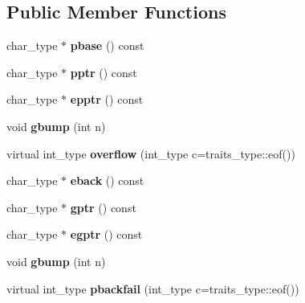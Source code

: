 \subsection*{Public Member Functions}
\begin{DoxyCompactItemize}
\item 
\mbox{\label{structtest__buf_a363207f713503c9b64d2c43400022557}} 
char\+\_\+type $\ast$ {\bfseries pbase} () const
\item 
\mbox{\label{structtest__buf_a7159b30a129e98ed27b64ce0e00cf88a}} 
char\+\_\+type $\ast$ {\bfseries pptr} () const
\item 
\mbox{\label{structtest__buf_a443a700343ba98e69ac49bf9a5280944}} 
char\+\_\+type $\ast$ {\bfseries epptr} () const
\item 
\mbox{\label{structtest__buf_a4ef57230c1f973a7581e35cc19548834}} 
void {\bfseries gbump} (int n)
\item 
\mbox{\label{structtest__buf_a43d4e8d47206c5921be776e4bb566ccb}} 
virtual int\+\_\+type {\bfseries overflow} (int\+\_\+type c=traits\+\_\+type\+::eof())
\item 
\mbox{\label{structtest__buf_a28125e70f3e3d4f7e6388feacd5a679a}} 
char\+\_\+type $\ast$ {\bfseries eback} () const
\item 
\mbox{\label{structtest__buf_a647a813e6beea56a0176dbe190a090de}} 
char\+\_\+type $\ast$ {\bfseries gptr} () const
\item 
\mbox{\label{structtest__buf_a885db87a4421d79460cc1007b45acdc4}} 
char\+\_\+type $\ast$ {\bfseries egptr} () const
\item 
\mbox{\label{structtest__buf_a4ef57230c1f973a7581e35cc19548834}} 
void {\bfseries gbump} (int n)
\item 
\mbox{\label{structtest__buf_adbd565e9d5b31502b7d9325dfe605fb5}} 
virtual int\+\_\+type {\bfseries pbackfail} (int\+\_\+type c=traits\+\_\+type\+::eof())
\item 

\end{DoxyCompactItemize}
